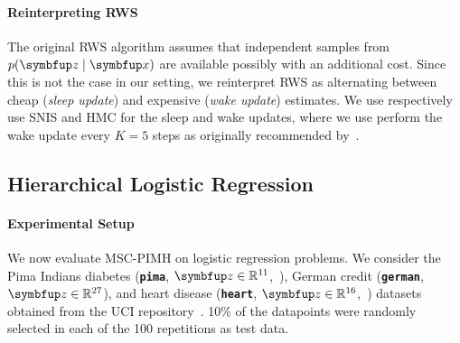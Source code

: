 \paragraph{Reinterpreting RWS}
The original RWS algorithm assumes that independent samples from \(p(\vz\mid\vx)\) are available possibly with an additional cost.
Since this is not the case in our setting, we reinterpret RWS as alternating between cheap (\textit{sleep update}) and expensive (\textit{wake update}) estimates.
We use respectively use SNIS and HMC for the sleep and wake updates, where we use perform the wake update every \(K=5\) steps as originally recommended by~\citet{DBLP:journals/corr/BornscheinB14}.


\subsection{Hierarchical Logistic Regression}\label{section:logistic}
\vspace{-0.05in}
\paragraph{Experimental Setup}
We now evaluate MSC-PIMH on logistic regression problems.
We consider the Pima Indians diabetes (\textbf{\texttt{pima}}, \(\vz \in \mathbb{R}^{11}\),~\citealt{smith_using_1988}), German credit (\textbf{\texttt{german}}, \(\vz \in \mathbb{R}^{27}\)), and heart disease (\textbf{\texttt{heart}}, \(\vz \in \mathbb{R}^{16}\),~\citealt{detrano_international_1989}) datasets obtained from the UCI repository~\citep{Dua:2019}.
10\% of the datapoints were randomly selected in each of the 100 repetitions as test data.

